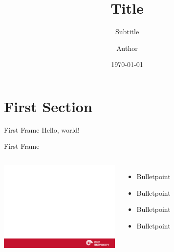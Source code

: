 
\usepackage{style/koc}

\title{Title}
\subtitle{Subtitle}
\date{\today}
\author{Author}






  \maketitle


  \section{First Section}
  \begin{frame}{First Frame}
    Hello, world!
  \end{frame}
  \begin{frame}{First Frame}
    \vskip5mm
 \begin{columns}
    \column{6cm}
 	  \includegraphics[width=6.0cm]{style/images/background}
     \column{5cm}
      \vspace{-4cm}
	\begin{itemize}
		 \itemsep1.2em
      	 \item Bulletpoint
      	 \item Bulletpoint
       	 \item Bulletpoint
     	 \item Bulletpoint
     \end{itemize}
 \end{columns}
  \end{frame}


